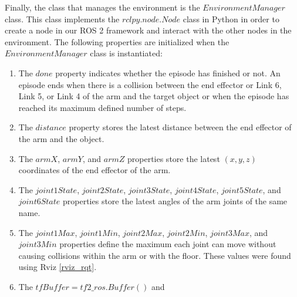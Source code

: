 \documentclass[12pt,oneside]{article}
\begin{document}
Finally, the class that manages the environment is the $EnvironmentManager$ class. This class implements the $rclpy.node.Node$ class in Python in order to create a node in our ROS 2 framework and interact with the other nodes in the environment.
The following properties are initialized when the $EnvironmentManager$ class is instantiated:
\begin{enumerate}
\item The $done$ property indicates whether the episode has finished or not. An episode ends when there is a collision between the end effector or Link 6, Link 5, or Link 4 of the arm and the target object or when the episode has reached its maximum defined number of steps.
\item\label{env-manager:distance} The $distance$ property stores the latest distance between the end effector of the arm and the object.
\item\label{env-manager:arm-coordinates} The $armX$, $armY$, and $armZ$ properties store the latest $(x, y, z)$ coordinates of the end effector of the arm.
\item The $joint1State$, $joint2State$, $joint3State$, $joint4State$, $joint5State$, and $joint6State$ properties store the latest angles of the arm joints of the same name. 
\item The $joint1Max$, $joint1Min$, $joint2Max$, $joint2Min$, $joint3Max$, and $joint3Min$ properties define the maximum each joint can move without causing collisions within the arm or with the floor. These values were found using Rviz \ref{rviz_rqt}.
\item The $tfBuffer = tf2\_ros.Buffer()$ and


\end{enumerate}
\end{document}
